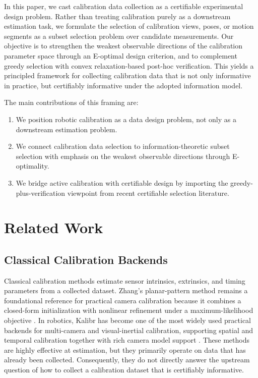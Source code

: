 \documentclass[11pt]{article}
\begin{document}
In this paper, we cast calibration data collection as a certifiable
experimental design problem.
Rather than treating calibration purely as a downstream estimation task, we
formulate the selection of calibration views, poses, or motion segments as a
subset selection problem over candidate measurements.
Our objective is to strengthen the weakest observable directions of the
calibration parameter space through an E-optimal design criterion, and to
complement greedy selection with convex relaxation-based post-hoc verification.
This yields a principled framework for collecting calibration data that is
not only informative in practice, but certifiably informative under the
adopted information model.

The main contributions of this framing are:
\begin{enumerate}[leftmargin=1.5em]
    \item We position robotic calibration as a data design problem, not only
    as a downstream estimation problem.
    \item We connect calibration data selection to information-theoretic
    subset selection with emphasis on the weakest observable directions
    through E-optimality.
    \item We bridge active calibration with certifiable design by importing
    the greedy-plus-verification viewpoint from recent certifiable selection
    literature.
\end{enumerate}

\section{Related Work}

\subsection{Classical Calibration Backends}
Classical calibration methods estimate sensor intrinsics, extrinsics, and
timing parameters from a collected dataset.
Zhang's planar-pattern method remains a foundational reference for practical
camera calibration because it combines a closed-form initialization with
nonlinear refinement under a maximum-likelihood objective
\citep{zhang2000flexible}.
In robotics, Kalibr has become one of the most widely used practical backends
for multi-camera and visual-inertial calibration, supporting spatial and
temporal calibration together with rich camera model support
\citep{furgale2013kalibr,kalibr_toolbox}.
These methods are highly effective at estimation, but they primarily operate
on data that has already been collected.
Consequently, they do not directly answer the upstream question of how to
collect a calibration dataset that is certifiably informative.
\end{document}
